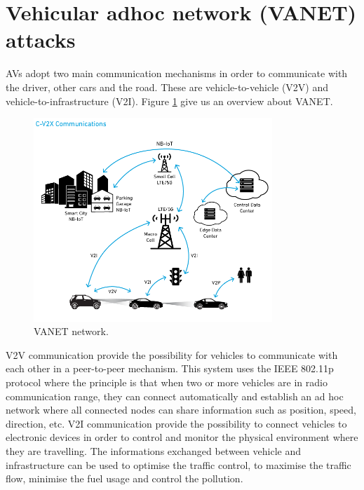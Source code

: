 \section{Vehicular adhoc network (VANET) attacks}
    AVs adopt two main communication mechanisms in order to communicate with the driver, other cars and the road. These are vehicle-to-vehicle (V2V) and vehicle-to-infrastructure (V2I). Figure \ref{fig:Vanet} give us an overview about VANET.
    \newline
    \begin{figure}
        \includegraphics[width=9cm]{./files/fig2_cv2x-communications_720px.png}
        \caption{VANET network.}
        \label{fig:Vanet}
    \end{figure}
    \newline
    V2V communication provide the possibility for vehicles to communicate with each other in a peer-to-peer mechanism. This system uses the IEEE 802.11p protocol where the principle is that when two or more vehicles are in radio communication range, they can connect automatically and establish an ad hoc network where all connected nodes can share information such as position, speed, direction, etc.
    \newline
    V2I communication provide the possibility to connect vehicles to electronic devices in order to control and monitor the physical environment where they are travelling. The informations exchanged between vehicle and infrastructure can be used to optimise the traffic control, to maximise the traffic flow, minimise the fuel usage and control the pollution.

